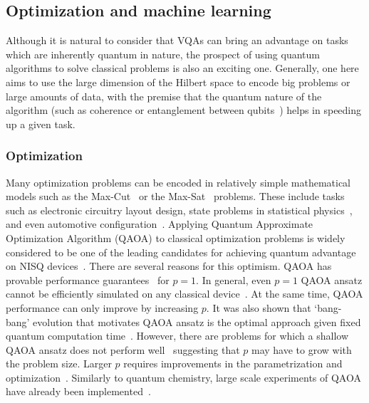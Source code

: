 \documentclass[prx,twocolumn,floatfix,superscriptaddress,longbibliography]{revtex4-1}
\newcommand{\<}{\langle}
\renewcommand{\>}{\rangle}
\begin{document}
\subsection{Optimization and machine learning}

Although it is natural to consider that VQAs can bring an advantage on tasks which are inherently quantum in nature, the prospect of using quantum algorithms to solve classical problems is also an exciting one. Generally, one here aims to use the large dimension of the Hilbert space to encode big problems or large amounts of data, with the premise that the quantum nature of the algorithm (such as coherence or entanglement between qubits~\cite{sharma2020reformulation})  helps in speeding up a given task.

\subsubsection{Optimization} Many optimization problems can be encoded in relatively simple mathematical models such as the Max-Cut~\cite{qaoaMaxCut2018} or the Max-Sat~\cite{Lin2016sat} problems. These include tasks such as electronic circuitry layout design, state problems in statistical physics~\cite{barahona1988application}, and even automotive configuration~\cite{kuchlin2000proving}. Applying Quantum Approximate Optimization Algorithm (QAOA) to classical optimization problems is widely considered to be one of the leading candidates for achieving quantum advantage on NISQ devices~\cite{crooks2018performance}. There are several reasons for this optimism. QAOA has provable performance guarantees~\cite{qaoa2014, farhi2014qaoa_for_bounded} for $p=1$. In general, even $p=1$ QAOA ansatz cannot be efficiently simulated on any classical device~\cite{farhi2016supremacy}. At the same time, QAOA performance can only improve by increasing $p$. It was also shown that `bang-bang' evolution that motivates QAOA ansatz is the optimal approach given fixed quantum computation time~\cite{Yang2017optimizing}. However, there are problems for which a shallow QAOA ansatz does not perform well~\cite{hastings2019classical, bravyi2019obstacles} suggesting that $p$ may have to grow with the problem size. Larger $p$ requires improvements in the parametrization and optimization~\cite{qaoaPerformanceLukin2018}. Similarly to quantum chemistry, large scale experiments of QAOA have already been implemented~\cite{arute2020quantum}.
\end{document}
